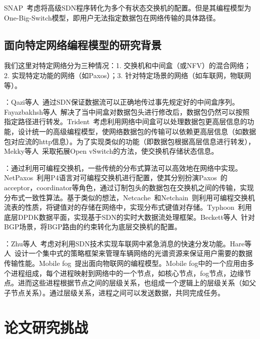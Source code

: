 \documentclass{ctexart}
\newcommand{\para}[1]{\smallskip\noindent {\bf #1}}
\begin{document}
SNAP~\cite{snap}考虑将高级SDN程序转化为多个有状态交换机的配置。但是其编程模型为One-Big-Switch模型，即用户无法指定数据包在网络传输的具体路径。


\subsection{面向特定网络编程模型的研究背景}

我们这里对特定网络分为三种情况：1. 交换机和中间盒（或NFV）的混合网络；2. 实现特定功能的网络（如Paxos）；3. 针对特定场景的网络（如车联网，物联网等）。

\para{混合网络}：Qazi等人~\cite{qazi2013simple}通过SDN保证数据流可以正确地传过事先规定好的中间盒序列。Fayazbakhsh等人~\cite{fayazbakhsh2014enforcing}解决了当中间盒对数据包头进行修改后，数据包仍然可以按照指定路径进行转发。Trident~\cite{gao2018t}考虑利用网络中间盒可以处理数据包更高层信息的功能，设计统一的高级编程模型，使网络数据包的传输可以依赖更高层信息（如数据包对应流的http信息）。为了实现类似的功能（即数据包根据高层信息进行转发），Mekky等人~\cite{mekky2014application}采取拓展Open vSwitch的方法，使交换机存储状态信息。

\para{实现特定功能的网络}：通过利用可编程交换机，一些传统的分布式算法可以高效地在网络中实现。NetPaxos~\cite{dang2015netpaxos,dang2016paxos}利用P4语言对可编程交换机进行配置，使其分别扮演Paxos~\cite{lamport2001paxos}的acceptor，coordinator等角色，通过订制包头的数据包在交换机之间的传输，实现分布式一致性算法。基于类似的想法，Netcache~\cite{jin2017netcache}和Netchain~\cite{jin2018netchain}则利用可编程交换机流表的性质，将键值对的存储在网络中，实现分布式键值对存储。Typhoon~\cite{cho2017typhoon}利用底层DPDK数据平面，实现基于SDN的实时大数据流处理框架。Beckett等人~\cite{beckett2016don}针对BGP场景，将BGP路由的约束转化为底层交换机的配置。

\para{特定场景网络}：Zhu等人~\cite{zhu2018sdn}考虑对利用SDN技术实现车联网中紧急消息的快速分发功能。Hare等人~\cite{hare2012policy}设计一个集中式的策略框架来管理车辆网络的光谱资源来保证用户需要的数据传输性能。Mobile fog~\cite{hong2013mobile}提出面向物联网的编程模型。Mobile fog中的一个应用由多个进程组成，每个进程映射到网络中的一个节点，如核心节点，fog节点，边缘节点。进而这些进程根据节点之间的层级关系，也组成一个逻辑上的层级关系（如父子节点关系）。通过层级关系，进程之间可以发送数据，共同完成任务。


\section{论文研究挑战}
\end{document}
